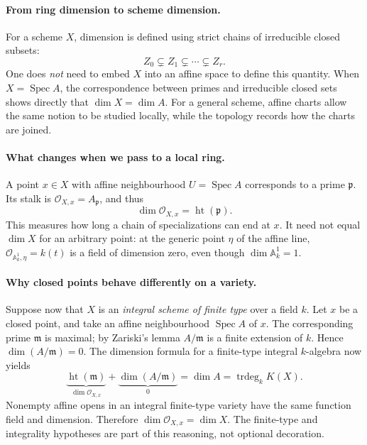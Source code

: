 \paragraph{From ring dimension to scheme dimension.}
For a scheme \(X\), dimension is defined using strict chains of
irreducible closed subsets:
\[
 Z_0\subsetneq Z_1\subsetneq\cdots\subsetneq Z_r.
\]
One does \emph{not} need to embed \(X\) into an affine space to define
this quantity.  When \(X=\operatorname{Spec}A\), the correspondence
between primes and irreducible closed sets shows directly that
\(\dim X=\dim A\).  For a general scheme, affine charts allow the
same notion to be studied locally, while the topology records how
the charts are joined.

\paragraph{What changes when we pass to a local ring.}
A point \(x\in X\) with affine neighbourhood
\(U=\operatorname{Spec}A\) corresponds to a prime \(\mathfrak p\).
Its stalk is \(\mathcal O_{X,x}=A_{\mathfrak p}\), and thus
\[
 \dim\mathcal O_{X,x}=\operatorname{ht}(\mathfrak p).
\]
This measures how long a chain of specializations can end at \(x\).
It need not equal \(\dim X\) for an arbitrary point: at the
generic point \(\eta\) of the affine line,
\(\mathcal O_{\mathbb A^1_k,\eta}=k(t)\) is a field of
dimension zero, even though \(\dim\mathbb A^1_k=1\).

\paragraph{Why closed points behave differently on a variety.}
Suppose now that \(X\) is an \emph{integral scheme of finite type}
over a field \(k\).  Let \(x\) be a closed point, and take an
affine neighbourhood \(\operatorname{Spec}A\) of \(x\).
The corresponding prime \(\mathfrak m\) is maximal; by Zariski's
lemma \(A/\mathfrak m\) is a finite extension of \(k\).
Hence \(\dim(A/\mathfrak m)=0\).  The dimension formula for a
finite-type integral \(k\)-algebra now yields
\[
 \underbrace{\operatorname{ht}(\mathfrak m)}_{\dim\mathcal O_{X,x}}
 +\underbrace{\dim(A/\mathfrak m)}_{0}
 =\dim A=\operatorname{trdeg}_k K(X).
\]
Nonempty affine opens in an integral finite-type variety have the
same function field and dimension.  Therefore
\(\dim\mathcal O_{X,x}=\dim X\).  The finite-type and
integrality hypotheses are part of this reasoning, not optional
decoration.

